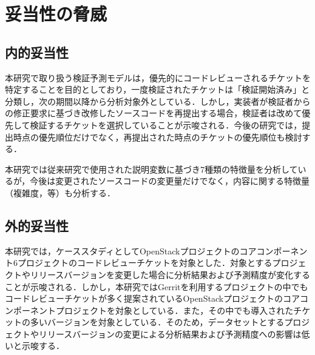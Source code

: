 \documentclass[T,J]{fose} %
\begin{document}
\section{妥当性の脅威}\label{sec:validity}
\subsection{内的妥当性}
本研究で取り扱う検証予測モデルは，優先的にコードレビューされるチケットを特定することを目的としており，一度検証されたチケットは「検証開始済み」と分類し，次の期間以降から分析対象外としている．しかし，実装者が検証者からの修正要求に基づき改修したソースコードを再提出する場合，検証者は改めて優先して検証するチケットを選択していることが示唆される．今後の研究では，提出時点の優先順位だけでなく，再提出された時点のチケットの優先順位も検討する．

本研究では従来研究で使用された説明変数に基づき7種類の特徴量を分析しているが，今後は変更されたソースコードの変更量だけでなく，内容に関する特徴量（複雑度，等）も分析する．

\subsection{外的妥当性}
本研究では，ケーススタディとしてOpenStackプロジェクトのコアコンポーネント6プロジェクトのコードレビューチケットを対象とした．対象とするプロジェクトやリリースバージョンを変更した場合に分析結果および予測精度が変化することが示唆される．しかし，本研究ではGerritを利用するプロジェクトの中でもコードレビューチケットが多く提案されているOpenStackプロジェクトのコアコンポーネントプロジェクトを対象としている．また，その中でも導入されたチケットの多いバージョンを対象としている．そのため，データセットとするプロジェクトやリリースバージョンの変更による分析結果および予測精度への影響は低いと示唆する．

\end{document}
